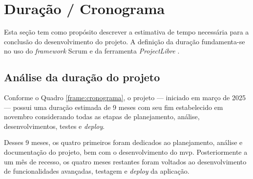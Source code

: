 \section{Duração / Cronograma}

\label{sec:duracao}

Esta seção tem como propósito descrever a estimativa de tempo necessária para a conclusão do desenvolvimento do projeto. A definição da duração fundamenta-se no uso do \textit{framework} Scrum \cite{scrum-2024} e da ferramenta \emph{ProjectLibre} \cite{projectlibre-2025}.

\subsection{Análise da duração do projeto}

Conforme o Quadro \ref{frame:cronograma}, o projeto --- iniciado em março de 2025 --- possui uma duração estimada de 9 meses com seu fim estabelecido em novembro considerando todas as etapas de planejamento, análise, desenvolvimentos, testes e \textit{deploy}.

Desses 9 meses, os quatro primeiros foram dedicados ao planejamento, análise e documentação do projeto, bem com o desenvolvimento do \gls{mvp}. Posteriormente a um mês de recesso, os quatro meses restantes foram voltados ao desenvolvimento de funcionalidades avançadas, testagem e \textit{deploy} da aplicação.


